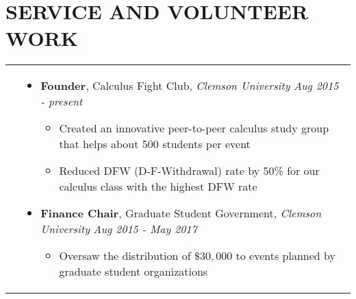 \documentclass[10pt]{article}
\begin{document}
\section{\textbf{SERVICE AND VOLUNTEER WORK}}
\vspace*{-\baselineskip}
\hskip-1.7in
\begin{tabularx}{1.5\linewidth}{>{\raggedleft\scshape}p{3cm}X}
   

  &\begin{itemize}
    \setlength\itemsep{.005em}      
     \item \textbf{Founder}, Calculus Fight Club, \textit{Clemson University}    \hspace{47 mm}\textit{Aug 2015 - present}
  
     \vspace{-2mm}
             \begin{itemize}
             \setlength\itemsep{.005em}
    \item Created an innovative peer-to-peer calculus study group that helps about 500 students per event
             
   \item Reduced DFW (D-F-Withdrawal) rate by 50\% for our calculus class with the highest DFW rate

   \end{itemize}  
   



    
                             \item \textbf{Finance Chair}, Graduate Student Government,  \textit{Clemson University}   \hspace{16 mm}\textit{Aug 2015 - May 2017}
  
        \vspace{-2mm}
             \begin{itemize}
             \setlength\itemsep{.005em}
   \item Oversaw the distribution of $ \$ 30,000$ to events planned by graduate student organizations

   \end{itemize}  

  

  \end{itemize} 

\end{tabularx}
\end{document}
